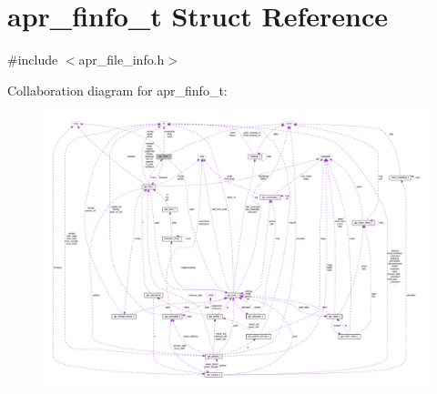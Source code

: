 \hypertarget{structapr__finfo__t}{}\section{apr\+\_\+finfo\+\_\+t Struct Reference}
\label{structapr__finfo__t}


{\ttfamily \#include $<$apr\+\_\+file\+\_\+info.\+h$>$}



Collaboration diagram for apr\+\_\+finfo\+\_\+t\+:
\nopagebreak
\begin{figure}[H]
\begin{center}
\leavevmode
\includegraphics[width=350pt]{structapr__finfo__t__coll__graph}
\end{center}
\end{figure}
